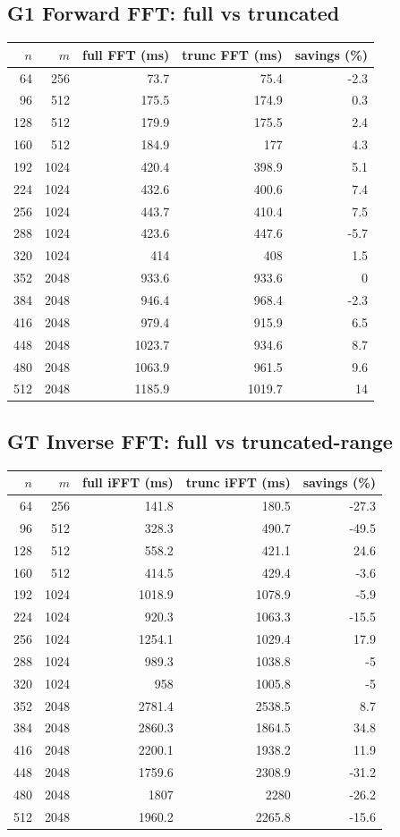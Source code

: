 \documentclass[11pt]{article}
\begin{document}
\subsection{G1 Forward FFT: full vs truncated}
\begin{longtable}{r r r r r}
\toprule
$n$ & $m$ & full FFT (ms) & trunc FFT (ms) & savings (\%) \\
\midrule
\endhead
64 & 256 & 73.7 & 75.4 & -2.3 \\
96 & 512 & 175.5 & 174.9 & 0.3 \\
128 & 512 & 179.9 & 175.5 & 2.4 \\
160 & 512 & 184.9 & 177 & 4.3 \\
192 & 1024 & 420.4 & 398.9 & 5.1 \\
224 & 1024 & 432.6 & 400.6 & 7.4 \\
256 & 1024 & 443.7 & 410.4 & 7.5 \\
288 & 1024 & 423.6 & 447.6 & -5.7 \\
320 & 1024 & 414 & 408 & 1.5 \\
352 & 2048 & 933.6 & 933.6 & 0 \\
384 & 2048 & 946.4 & 968.4 & -2.3 \\
416 & 2048 & 979.4 & 915.9 & 6.5 \\
448 & 2048 & 1023.7 & 934.6 & 8.7 \\
480 & 2048 & 1063.9 & 961.5 & 9.6 \\
512 & 2048 & 1185.9 & 1019.7 & 14 \\
\bottomrule
\end{longtable}

\subsection{GT Inverse FFT: full vs truncated-range}
\begin{longtable}{r r r r r}
\toprule
$n$ & $m$ & full iFFT (ms) & trunc iFFT (ms) & savings (\%) \\
\midrule
\endhead
64 & 256 & 141.8 & 180.5 & -27.3 \\
96 & 512 & 328.3 & 490.7 & -49.5 \\
128 & 512 & 558.2 & 421.1 & 24.6 \\
160 & 512 & 414.5 & 429.4 & -3.6 \\
192 & 1024 & 1018.9 & 1078.9 & -5.9 \\
224 & 1024 & 920.3 & 1063.3 & -15.5 \\
256 & 1024 & 1254.1 & 1029.4 & 17.9 \\
288 & 1024 & 989.3 & 1038.8 & -5 \\
320 & 1024 & 958 & 1005.8 & -5 \\
352 & 2048 & 2781.4 & 2538.5 & 8.7 \\
384 & 2048 & 2860.3 & 1864.5 & 34.8 \\
416 & 2048 & 2200.1 & 1938.2 & 11.9 \\
448 & 2048 & 1759.6 & 2308.9 & -31.2 \\
480 & 2048 & 1807 & 2280 & -26.2 \\
512 & 2048 & 1960.2 & 2265.8 & -15.6 \\
\bottomrule
\end{longtable}
\end{document}

